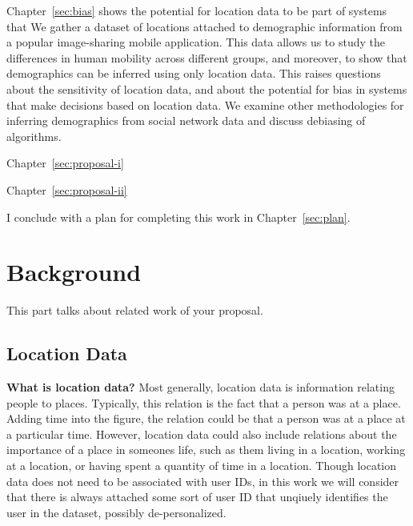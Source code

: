 \documentclass[12pt]{article}
\newcommand{\chap}[1]{Chapter~\ref{#1}}
\begin{document}
\chap{sec:bias} shows the potential for location data to be part of systems that 
We gather a dataset of locations attached to demographic information from a popular image-sharing mobile application.
This data allows us to study the differences in human mobility across different groups, and moreover, to show that demographics can be inferred using only location data.
This raises questions about the sensitivity of location data, and about the potential for bias in systems that make decisions based on location data.
We examine other methodologies for inferring demographics from social network data and discuss debiasing of algorithms.

\chap{sec:proposal-i}

\chap{sec:proposal-ii}

I conclude with a plan for completing this work in \chap{sec:plan}.








\section{Background}
\label{sec:background}
This part talks about related work of your proposal.

\subsection{Location Data}
\textbf{What is location data?}
Most generally, location data is information relating people to places.
Typically, this relation is the fact that a person was at a place.
Adding time into the figure, the relation could be that a person was at a place at a particular time.
However, location data could also include relations about the importance of a place in someones life, such as them living in a location, working at a location, or having spent a quantity of time in a location.
Though location data does not need to be associated with user IDs, in this work we will consider that there is always attached some sort of user ID that unqiuely identifies the user in the dataset, possibly de-personalized.
\end{document}
